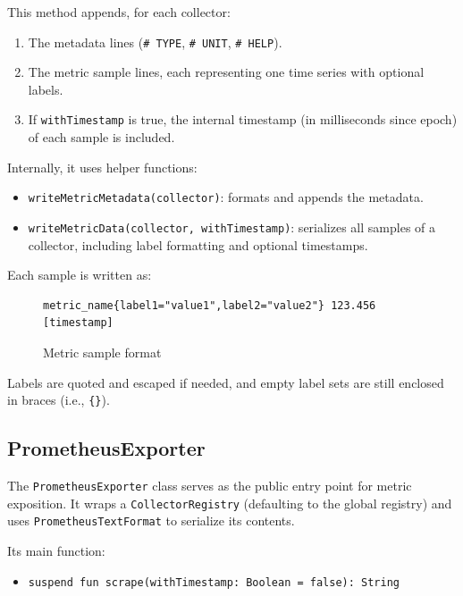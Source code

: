 This method appends, for each collector:

\begin{enumerate}
    \item The metadata lines (\texttt{\# TYPE}, \texttt{\# UNIT}, \texttt{\# HELP}).
    \item The metric sample lines, each representing one time series with optional labels.
    \item If \texttt{withTimestamp} is true, the internal timestamp (in milliseconds since epoch) of each sample is included.
\end{enumerate}

Internally, it uses helper functions:

\begin{itemize}
    \item \texttt{writeMetricMetadata(collector)}: formats and appends the metadata.
    \item \texttt{writeMetricData(collector, withTimestamp)}: serializes all samples of a collector, including label formatting and optional timestamps.
\end{itemize}

Each sample is written as:

\begin{figure}[h]
    \begin{lstlisting}
metric_name{label1="value1",label2="value2"} 123.456 [timestamp]
    \end{lstlisting}
    \caption{Metric sample format}
\end{figure}

Labels are quoted and escaped if needed, and empty label sets are still enclosed in braces (i.e., \texttt{\{\}}).

\subsection{PrometheusExporter}\label{subsec:prometheusexporter}

The \texttt{PrometheusExporter} class serves as the public entry point for metric exposition.
It wraps a \texttt{CollectorRegistry} (defaulting to the global registry) and uses \texttt{PrometheusTextFormat} to serialize its contents.

Its main function:

\begin{itemize}
    \item \texttt{suspend fun scrape(withTimestamp: Boolean = false): String}
\end{itemize}

